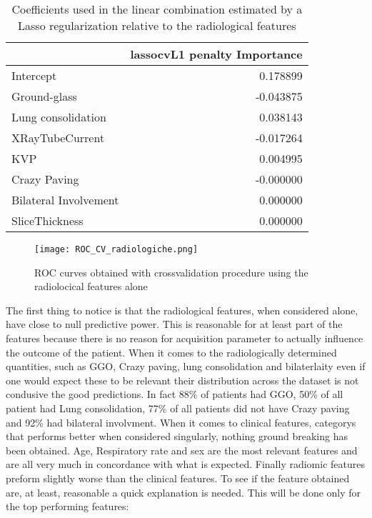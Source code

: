 \begin{table}
	\caption{Coefficients used in the linear combination estimated by a Lasso regularization relative to the radiological features\label{tab:ParamRadiologiche}}
		\centering
			\begin{tabular}{lr}
			\toprule
			{} &  lassocvL1 penalty Importance \\
			\midrule
			Intercept             &                      0.178899 \\
			Ground-glass          &                     -0.043875 \\
			Lung consolidation    &                      0.038143 \\
			XRayTubeCurrent       &                     -0.017264 \\
			KVP                   &                      0.004995 \\
			Crazy Paving          &                     -0.000000 \\
			Bilateral Involvement &                      0.000000 \\
			SliceThickness        &                      0.000000 \\
			\bottomrule
			\end{tabular}
\end{table}

\begin{figure}[htbp]
	\centering
  		\texttt{[image: ROC\_CV\_radiologiche.png]}
        \caption{ROC curves obtained with crossvalidation procedure using the radiolocical features alone\label{fig:RocDeathRadiologiche}}
\end{figure}

The first thing to notice is that the radiological features, when considered alone, have close to null predictive power. This is reasonable for at least part of the features because there is no reason for acquisition parameter to actually influence the outcome of the patient.  When it comes to the radiologically determined quantities, such as GGO, Crazy paving, lung consolidation and bilaterlaity even if one would expect these to be relevant their distribution across the dataset is not condusive the good predictions. In fact 88\% of patients had GGO, 50\% of all patient had Lung consolidation, 77\% of all patients did not have Crazy paving and 92\% had bilateral involvment. When it comes to clinical features, categorys that performs better when considered singularly, nothing ground breaking has been obtained. Age, Respiratory rate and sex are the most relevant features and are all very much in concordance with what is expected. Finally radiomic features preform slightly worse than the clinical features. To see if the feature obtained are, at least, reasonable a quick explanation is needed. This will be done only for the top performing features:

